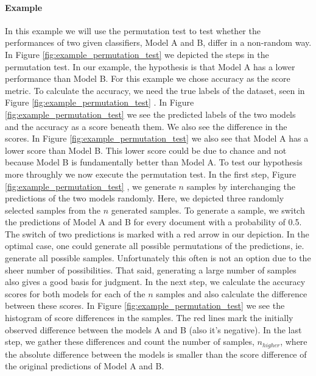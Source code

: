 \paragraph{Example}
In this example we will use the permutation test to test whether the 
  performances of two given classifiers, Model A and B, differ in a non-random way.
In Figure \ref{fig:example_permutation_test} we depicted the steps in the permutation test. 
In our example, the hypothesis is that Model A has a lower performance than Model B.
For this example we chose accuracy as the score metric.
To calculate the accuracy, we need the true labels of the dataset, seen in Figure \ref{fig:example_permutation_test} \textbf{}.
In Figure \ref{fig:example_permutation_test} \textbf{} we see the predicted labels of the two models and the accuracy as a score beneath them. 
We also see the difference in the scores.
In Figure \ref{fig:example_permutation_test} \textbf{} we also see that Model A has a lower score than Model B.
This lower score could be due to chance and not because Model B is fundamentally better than Model A.
To test our hypothesis more throughly we now execute the permutation test.
In the first step, Figure \ref{fig:example_permutation_test} \textbf{}, we generate $n$ samples by interchanging the predictions of the two models randomly.
Here, we depicted three randomly selected samples from the $n$ generated samples.
To generate a sample, we switch the predictions of Model A and B for every document with a probability of 0.5.
The switch of two predictions is marked with a red arrow in our depiction.
In the optimal case, one could generate all possible permutations of the predictions, ie. generate all possible samples.
Unfortunately this often is not an option due to the sheer number of possibilities. That said, generating a large number of samples also gives a good basis for judgment.
In the next step, we calculate the accuracy scores for both models for each of the $n$ samples and also calculate the difference between these scores.
In Figure \ref{fig:example_permutation_test} \textbf{} we see the histogram of score differences in the samples.
The red lines mark the initially observed difference between the models A and B (also it's negative).
In the last step, we gather these differences and count the number of samples, $n_{higher}$, where the absolute difference between the models is smaller than the score difference of the original predictions of Model A and B.

